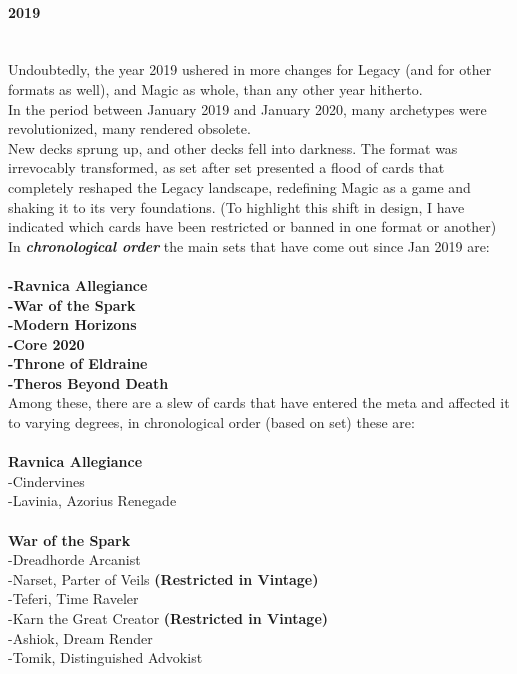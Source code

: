 \documentclass{report}
\begin{document}
\paragraph{2019\\\\}
Undoubtedly, the year 2019 ushered in more changes for Legacy (and for other formats as well), and Magic as whole, than any other year hitherto. \\In the period between January 2019 and January 2020, many archetypes were revolutionized, many rendered obsolete.\\ New decks sprung up, and other decks fell into darkness. The format was irrevocably transformed, as set after set presented a flood of cards that completely reshaped the Legacy landscape, redefining Magic as a game and shaking it to its very foundations. (To highlight this shift in design, I have indicated which cards have been restricted or banned in one format or another)\\
In \textbf{\emph{chronological order}} the main sets that have come out since Jan 2019 are:\\\\
\textbf{-Ravnica Allegiance\\}
\textbf{-War of the Spark\\}
\textbf{-Modern Horizons\\}
\textbf{-Core 2020\\}
\textbf{-Throne of Eldraine\\}
\textbf{-Theros Beyond Death\\}
Among these, there are a slew of cards that have entered the meta and affected it to varying degrees, in chronological order (based on set) these are:\\\\
\textbf{Ravnica Allegiance\\}
-Cindervines\\
-Lavinia, Azorius Renegade\\\\
\textbf{War of the Spark\\}
-Dreadhorde Arcanist\\
-Narset, Parter of Veils \textbf{(Restricted in Vintage)}\\
-Teferi, Time Raveler\\
-Karn the Great Creator \textbf{(Restricted in Vintage)}\\
-Ashiok, Dream Render\\
-Tomik, Distinguished Advokist\\
\end{document}
